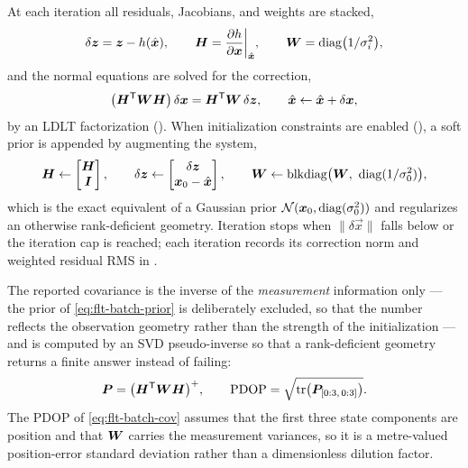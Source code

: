 At each iteration all residuals, Jacobians, and weights are stacked,
\begin{equation}
  \label{eq:flt-batch-stack}
  \delta \bm{z} = \bm{z} - h(\hat{\bm{x}}),
  \qquad
  \bm{H} = \frac{\partial h}{\partial \bm{x}}\bigg|_{\hat{\bm{x}}},
  \qquad
  \bm{W} = \operatorname{diag}\bigl(1/\sigma_i^2\bigr) ,
\end{equation}
and the normal equations are solved for the correction,
\begin{equation}
  \label{eq:flt-batch-normal}
  \bigl(\bm{H}^{\mathsf{T}} \bm{W} \bm{H}\bigr)\,\delta \bm{x}
    = \bm{H}^{\mathsf{T}} \bm{W}\,\delta \bm{z},
  \qquad
  \hat{\bm{x}} \leftarrow \hat{\bm{x}} + \delta \bm{x} ,
\end{equation}
by an LDLT factorization (). When
initialization constraints are enabled (), a soft
prior is appended by augmenting the system,
\begin{equation}
  \label{eq:flt-batch-prior}
  \bm{H} \leftarrow \begin{bmatrix} \bm{H} \\ \bm{I} \end{bmatrix},
  \qquad
  \delta \bm{z} \leftarrow
    \begin{bmatrix} \delta \bm{z} \\ \bm{x}_0 - \hat{\bm{x}} \end{bmatrix},
  \qquad
  \bm{W} \leftarrow
    \operatorname{blkdiag}\bigl(\bm{W},\ \operatorname{diag}(1/\sigma_{0}^2)\bigr) ,
\end{equation}
which is the exact equivalent of a Gaussian prior $\mathcal{N}(\bm{x}_0,
\operatorname{diag}(\sigma_0^2))$ and regularizes an otherwise rank-deficient geometry.
Iteration stops when $\lVert \delta \vec{x}\rVert$ falls below
 or the iteration cap  is reached;
each iteration records its correction norm and weighted residual RMS in
.

The reported covariance is the inverse of the \emph{measurement} information
only --- the prior of \cref{eq:flt-batch-prior} is deliberately excluded, so
that the number reflects the observation geometry rather than the strength of
the initialization --- and is computed by an SVD pseudo-inverse so that a
rank-deficient geometry returns a finite answer instead of failing:
\begin{equation}
  \label{eq:flt-batch-cov}
  \bm{P} = \bigl(\bm{H}^{\mathsf{T}} \bm{W} \bm{H}\bigr)^{+},
  \qquad
  \text{PDOP} = \sqrt{\operatorname{tr}\bigl(\bm{P}_{[0:3,\,0:3]}\bigr)} .
\end{equation}
The PDOP of \cref{eq:flt-batch-cov} assumes that the first three state
components are position and that $\bm{W}$ carries the measurement variances,
so it is a metre-valued position-error standard deviation rather than a
dimensionless dilution factor.

